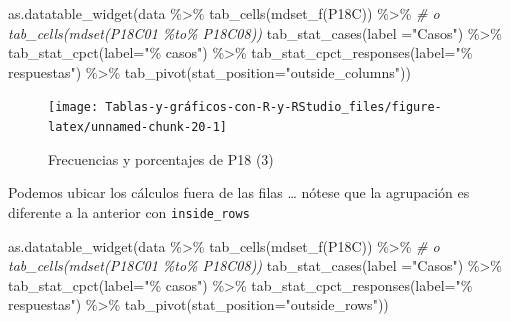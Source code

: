 \documentclass[
]{book}
\newenvironment{Shaded}{\begin{snugshade}}{\end{snugshade}}
\newcommand{\AttributeTok}[1]{\textcolor[rgb]{0.77,0.63,0.00}{#1}}
\newcommand{\CommentTok}[1]{\textcolor[rgb]{0.56,0.35,0.01}{\textit{#1}}}
\newcommand{\FunctionTok}[1]{\textcolor[rgb]{0.00,0.00,0.00}{#1}}
\newcommand{\NormalTok}[1]{#1}
\newcommand{\SpecialCharTok}[1]{\textcolor[rgb]{0.00,0.00,0.00}{#1}}
\newcommand{\StringTok}[1]{\textcolor[rgb]{0.31,0.60,0.02}{#1}}
\begin{document}
\begin{Shaded}
\begin{Highlighting}[]
\FunctionTok{as.datatable\_widget}\NormalTok{(data }\SpecialCharTok{\%\textgreater{}\%} 
  \FunctionTok{tab\_cells}\NormalTok{(}\FunctionTok{mdset\_f}\NormalTok{(P18C)) }\SpecialCharTok{\%\textgreater{}\%}  \CommentTok{\# o tab\_cells(mdset(P18C01 \%to\% P18C08))}
  \FunctionTok{tab\_stat\_cases}\NormalTok{(}\AttributeTok{label =}\StringTok{"Casos"}\NormalTok{) }\SpecialCharTok{\%\textgreater{}\%} 
  \FunctionTok{tab\_stat\_cpct}\NormalTok{(}\AttributeTok{label=}\StringTok{"\% casos"}\NormalTok{) }\SpecialCharTok{\%\textgreater{}\%} 
  \FunctionTok{tab\_stat\_cpct\_responses}\NormalTok{(}\AttributeTok{label=}\StringTok{"\% respuestas"}\NormalTok{) }\SpecialCharTok{\%\textgreater{}\%} 
  \FunctionTok{tab\_pivot}\NormalTok{(}\AttributeTok{stat\_position=}\StringTok{"outside\_columns"}\NormalTok{))}
\end{Highlighting}
\end{Shaded}

\begin{figure}[H]

{\centering \texttt{[image: Tablas-y-gráficos-con-R-y-RStudio\_files/figure-latex/unnamed-chunk-20-1]} 

}

\caption{Frecuencias y porcentajes de P18 (3)}\label{fig:unnamed-chunk-20}
\end{figure}

Podemos ubicar los cálculos fuera de las filas \ldots{} nótese que la agrupación es diferente a la anterior con \texttt{inside\_rows}

\begin{Shaded}
\begin{Highlighting}[]
\FunctionTok{as.datatable\_widget}\NormalTok{(data }\SpecialCharTok{\%\textgreater{}\%} 
  \FunctionTok{tab\_cells}\NormalTok{(}\FunctionTok{mdset\_f}\NormalTok{(P18C)) }\SpecialCharTok{\%\textgreater{}\%}  \CommentTok{\# o tab\_cells(mdset(P18C01 \%to\% P18C08))}
  \FunctionTok{tab\_stat\_cases}\NormalTok{(}\AttributeTok{label =}\StringTok{"Casos"}\NormalTok{) }\SpecialCharTok{\%\textgreater{}\%} 
  \FunctionTok{tab\_stat\_cpct}\NormalTok{(}\AttributeTok{label=}\StringTok{"\% casos"}\NormalTok{) }\SpecialCharTok{\%\textgreater{}\%} 
  \FunctionTok{tab\_stat\_cpct\_responses}\NormalTok{(}\AttributeTok{label=}\StringTok{"\% respuestas"}\NormalTok{) }\SpecialCharTok{\%\textgreater{}\%} 
  \FunctionTok{tab\_pivot}\NormalTok{(}\AttributeTok{stat\_position=}\StringTok{"outside\_rows"}\NormalTok{))}
\end{Highlighting}
\end{Shaded}
\end{document}

